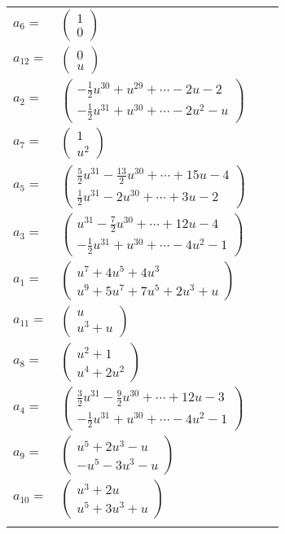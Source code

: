\documentclass[1p]{elsarticle_modified}
\theoremstyle{definition}
\begin{document}
\begin{tabular}{m{7pt} m{180pt} m{7pt} m{180pt} }
\flushright $a_{6}=$&$\begin{pmatrix}1\\0\end{pmatrix}$ \\
\flushright $a_{12}=$&$\begin{pmatrix}0\\u\end{pmatrix}$ \\
\flushright $a_{2}=$&$\begin{pmatrix}-\frac{1}{2} u^{30}+u^{29}+\cdots-2 u-2\\-\frac{1}{2} u^{31}+u^{30}+\cdots-2 u^2- u\end{pmatrix}$ \\
\flushright $a_{7}=$&$\begin{pmatrix}1\\u^2\end{pmatrix}$ \\
\flushright $a_{5}=$&$\begin{pmatrix}\frac{5}{2} u^{31}-\frac{13}{2} u^{30}+\cdots+15 u-4\\\frac{1}{2} u^{31}-2 u^{30}+\cdots+3 u-2\end{pmatrix}$ \\
\flushright $a_{3}=$&$\begin{pmatrix}u^{31}-\frac{7}{2} u^{30}+\cdots+12 u-4\\-\frac{1}{2} u^{31}+u^{30}+\cdots-4 u^2-1\end{pmatrix}$ \\
\flushright $a_{1}=$&$\begin{pmatrix}u^7+4 u^5+4 u^3\\u^9+5 u^7+7 u^5+2 u^3+u\end{pmatrix}$ \\
\flushright $a_{11}=$&$\begin{pmatrix}u\\u^3+u\end{pmatrix}$ \\
\flushright $a_{8}=$&$\begin{pmatrix}u^2+1\\u^4+2 u^2\end{pmatrix}$ \\
\flushright $a_{4}=$&$\begin{pmatrix}\frac{3}{2} u^{31}-\frac{9}{2} u^{30}+\cdots+12 u-3\\-\frac{1}{2} u^{31}+u^{30}+\cdots-4 u^2-1\end{pmatrix}$ \\
\flushright $a_{9}=$&$\begin{pmatrix}u^5+2 u^3- u\\- u^5-3 u^3- u\end{pmatrix}$ \\
\flushright $a_{10}=$&$\begin{pmatrix}u^3+2 u\\u^5+3 u^3+u\end{pmatrix}$\\&\end{tabular}
\end{document}
